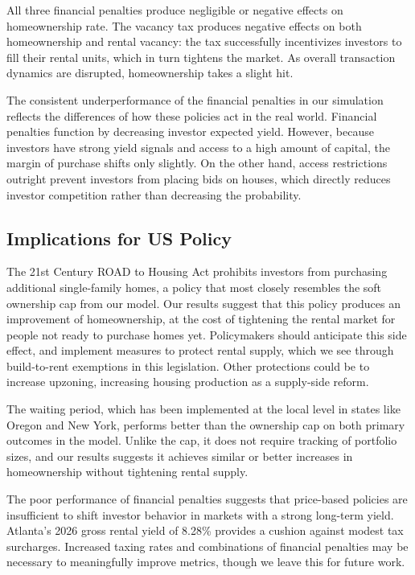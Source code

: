 \documentclass[twocolumn,showpacs,%
  nofootinbib,aps,superscriptaddress,%
  eqsecnum,prd,notitlepage,showkeys,10pt]{revtex4-1}
\begin{document}
All three financial penalties produce negligible or negative effects on homeownership rate. The vacancy tax produces negative effects on both homeownership and rental vacancy: the tax successfully incentivizes investors to fill their rental units, which in turn tightens the market. As overall transaction dynamics are disrupted, homeownership takes a slight hit. \newline

The consistent underperformance of the financial penalties in our simulation reflects the differences of how these policies act in the real world. Financial penalties function by decreasing investor expected yield. However, because investors have strong yield signals and access to a high amount of capital, the margin of purchase shifts only slightly. On the other hand, access restrictions outright prevent investors from placing bids on houses, which directly reduces investor competition rather than decreasing the probability. 

\subsection{Implications for US Policy}
The 21st Century ROAD to Housing Act prohibits investors from purchasing additional single-family homes, a policy that most closely resembles the soft ownership cap from our model. Our results suggest that this policy produces an improvement of homeownership, at the cost of tightening the rental market for people not ready to purchase homes yet. Policymakers should anticipate this side effect, and implement measures to protect rental supply, which we see through build-to-rent exemptions in this legislation. Other protections could be to increase upzoning, increasing housing production as a supply-side reform. \newline

The waiting period, which has been implemented at the local level in states like Oregon and New York, performs better than the ownership cap on both primary outcomes in the model. Unlike the cap, it does not require tracking of portfolio sizes, and our results suggests it achieves similar or better increases in homeownership without tightening rental supply. \newline

The poor performance of financial penalties suggests that price-based policies are insufficient to shift investor behavior in markets with a strong long-term yield. Atlanta's 2026 gross rental yield of 8.28\% provides a cushion against modest tax surcharges. Increased taxing rates and combinations of financial penalties may be necessary to meaningfully improve metrics, though we leave this for future work. \newline
\end{document}
